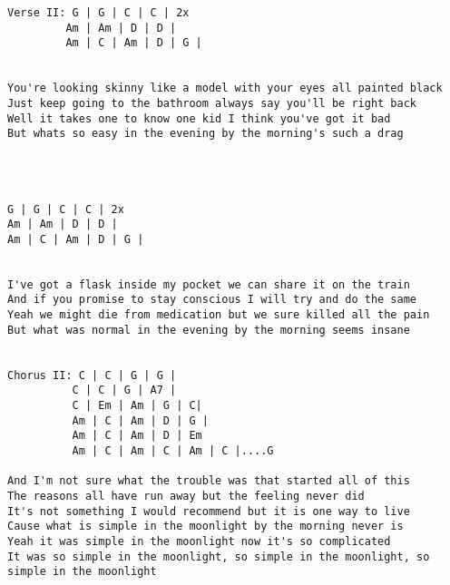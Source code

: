 \documentclass[leqno]{memoir}
\begin{document}
\begin{verbatim}
Verse II: G | G | C | C | 2x
         Am | Am | D | D |
         Am | C | Am | D | G |

 
You're looking skinny like a model with your eyes all painted black
Just keep going to the bathroom always say you'll be right back
Well it takes one to know one kid I think you've got it bad
But whats so easy in the evening by the morning's such a drag




G | G | C | C | 2x
Am | Am | D | D |
Am | C | Am | D | G |


I've got a flask inside my pocket we can share it on the train
And if you promise to stay conscious I will try and do the same
Yeah we might die from medication but we sure killed all the pain
But what was normal in the evening by the morning seems insane


Chorus II: C | C | G | G |
          C | C | G | A7 |
          C | Em | Am | G | C|
          Am | C | Am | D | G |
          Am | C | Am | D | Em
          Am | C | Am | C | Am | C |....G

And I'm not sure what the trouble was that started all of this 
The reasons all have run away but the feeling never did
It's not something I would recommend but it is one way to live
Cause what is simple in the moonlight by the morning never is 
Yeah it was simple in the moonlight now it's so complicated 
It was so simple in the moonlight, so simple in the moonlight, so simple in the moonlight
\end{verbatim}
\newpage
\end{document}
